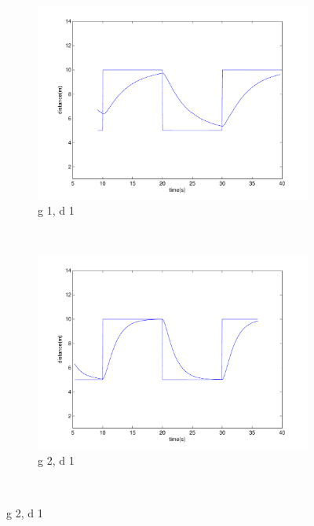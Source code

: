 \begin{figure}
        \centering
        \begin{subfigure}[b]{0.3\textwidth}
                \includegraphics[width=\textwidth]{fig/gain1d1.pdf}
                \caption{g 1, d 1}
                \label{fig:gull}
        \end{subfigure}%
        ~ %
        \begin{subfigure}[b]{0.3\textwidth}
                \includegraphics[width=\textwidth]{fig/gain2d1.pdf}
                \caption{g 2, d 1}
                \label{fig:tiger}
        \end{subfigure}
        ~ %

\end{figure}
